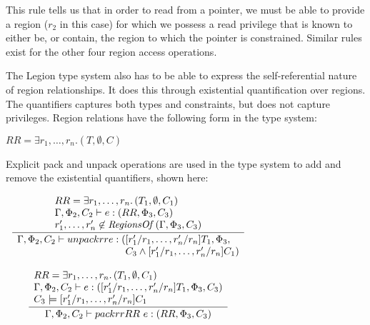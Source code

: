 This rule tells us that in order to read from a pointer, we must be able to
provide a region ($r_2$ in this case) for which we possess a read privilege that 
is known to either be, or contain, the region to which the pointer is
constrained.  Similar rules exist for the other four region access operations.

The Legion type system also has to be able to express the self-referential
nature of region relationships.  It does this through existential quantification
over regions.  The quantifiers captures both types and constraints, but does
not capture privileges.  Region relations have the following form in the
type system:

\begin{center}
$RR = \exists r_1, \ldots, r_n.\left(T, \emptyset, C\right)$
\end{center}

Explicit pack and unpack operations are used in the type system
to add and remove the existential quantifiers, shown here:

\begin{center}
\begin{math}
\begin{array}{c}
\infrule{
\begin{array}{l}
RR = \exists r_1, \ldots, r_n.\left(T_1, \emptyset, C_1\right) \\
\Gamma, \Phi_2, C_2 \vdash e : \left(RR, \Phi_3, C_3\right) \\
r'_1, \ldots, r'_n \not\in \mathit{RegionsOf}\left(\Gamma, \Phi_3, C_3\right)
\end{array}
}{
\begin{array}{l@{}l}
\Gamma, \Phi_2, C_2 \vdash unpackrr{ }e : ( & [r'_1/r_1,\ldots,r'_n/r_n]T_1, \Phi_3, \\
& C_3 \wedge [r'_1/r_1,\ldots,r'_n/r_n]C_1)
\end{array}
}
\\
\\
\infrule{
\begin{array}{l}
RR = \exists r_1, \ldots, r_n.\left(T_1, \emptyset, C_1\right) \\
\Gamma, \Phi_2, C_2 \vdash e : \left([r'_1/r_1,\ldots,r'_n/r_n]T_1, \Phi_3, C_3\right) \\
C_3 \models [r'_1/r_1,\ldots,r'_n/r_n]C_1
\end{array}
}{
\begin{array}{l}
\Gamma, \Phi_2, C_2 \vdash packrr{ }RR\mbox{ }e : \left(RR, \Phi_3, C_3\right) \\
\end{array}
}
\end{array}
\end{math}
\end{center}

